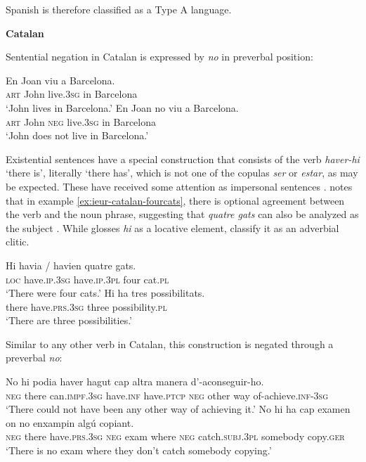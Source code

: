 ﻿\documentclass[output=paper]{langsci/langscibook}
\begin{document}
\begin{unindented}
Spanish is therefore classified as a Type A language. 

\textbf{Catalan}

Sentential negation in Catalan is expressed by \textit{no} in preverbal position: 
%
\begin{exe}\ex \gll En Joan viu a Barcelona. \\
\textsc{art} John  live.\textsc{3sg} in Barcelona \\
    \glt `John lives in Barcelona.' \citep[154]{Hualde1992}
\ex \gll En Joan  no viu a Barcelona. \\
\textsc{art} John  \textsc{neg} live.\textsc{3sg} in Barcelona \\
    \glt `John does not live in Barcelona.' \citep[154]{Hualde1992}
    \end{exe}

Existential sentences have a special construction that consists of the verb
\textit{haver-hi} `there is', literally `there has', which is not one of
the copulas \textit{ser} or \textit{estar}, as may be expected. These have
received some attention as impersonal sentences \parencites[81]{Hualde1992}
[460]{WheelerYates1999}. \citet[81]{Hualde1992} notes that in example
\ref{ex:ieur-catalan-fourcats},
there is optional agreement between the verb and the noun phrase,
suggesting that \textit{quatre gats} can also be analyzed as the subject
\parencite[see also][460]{WheelerYates1999}. While \citet{Hualde1992} glosses \textit{hi} as a locative element, \citet[460]{WheelerYates1999} classify it as an adverbial clitic. 
%
\begin{exe}\ex\label{ex:ieur-catalan-fourcats} \gll Hi havia / havien quatre gats. \\
\textsc{loc} have.\textsc{ip.3sg} {} have.\textsc{ip.3pl} four cat.\textsc{pl} \\
    \glt `There were four cats.' \citep[81]{Hualde1992}
\ex \gll Hi ha tres possibilitats.  \\
there have.\textsc{prs.3sg} three  possibility.\textsc{pl} \\
    \glt `There are three possibilities.' \parencite[460]{WheelerYates1999}
    \end{exe}

Similar to any other verb in Catalan, this construction is negated through a preverbal \textit{no}: 
%
\begin{exe}\ex \gll No hi podia haver hagut cap  altra manera d’-aconseguir-ho. \\
\textsc{neg} there can.\textsc{impf.3sg} have.\textsc{inf} have.\textsc{ptcp} \textsc{neg} other way of-achieve.\textsc{inf-3sg} \\
    \glt `There could not have been any other way of achieving it.'
\parencite[460]{WheelerYates1999}
\ex \gll No hi ha cap examen on no enxampin algú copiant.  \\
\textsc{neg} there have.\textsc{prs.3sg} \textsc{neg} exam     where \textsc{neg} catch.\textsc{subj.3pl} somebody copy.\textsc{ger} \\
    \glt `There is no exam where they don't catch somebody copying.' \parencite[422]{WheelerYates1999}
    \end{exe}


\end{unindented}
\end{document}
